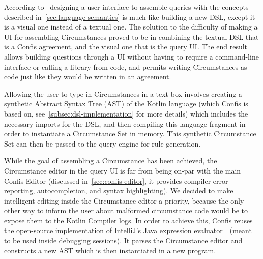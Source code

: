 According to~\cite{fowlerLangWorkbench} designing a user interface to assemble queries with the concepts described in~\autoref{sec:language-semantics} is much like building a new DSL, except it is a visual one instead of a textual one.
The solution to the difficulty of making a UI for assembling Circumstances proved to be in combining the textual DSL that is a Confis agreement, and the visual one that is the query UI\@.
The end result allows building questions through a UI without having to require a command-line interface or calling a library from code, and permits writing Circumstances as code just like they would be written in an agreement.

Allowing the user to type in Circumstances in a text box involves creating a synthetic Abstract Syntax Tree (AST) of the Kotlin language (which Confis is based on, see~\autoref{subsec:dsl-implementation} for more details) which includes the necessary imports for the DSL, and then compiling this language fragment in order to instantiate a Circumstance Set in memory.
This synthetic Circumstance Set can then be passed to the query engine for rule generation.

While the goal of assembling a Circumstance has been achieved, the Circumstance editor in the query UI is far from being on-par with the main Confis Editor (discussed in~\autoref{sec:confis-editor}, it provides compiler error reporting, autocompletion, and syntax highlighting).
We decided to make intelligent editing inside the Circumstance editor a priority, because the only other way to inform the user about malformed circumstance code would be to expose them to the Kotlin Compiler logs.
In order to achieve this, Confis reuses the open-source implementation of IntelliJ's Java expression evaluator~\cite{intelliJRepo}~(meant to be used inside debugging sessions).
It parses the Circumstance editor and constructs a new AST which is then instantiated in a new program.


